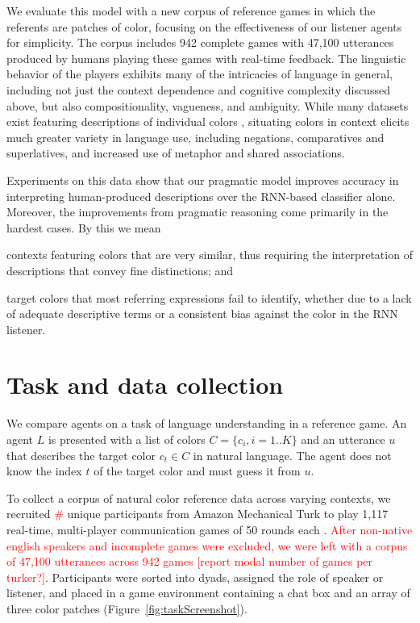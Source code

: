 \documentclass[11pt,letterpaper]{article}
\newcommand{\Listener}{L}
\newcommand{\utt}{u}
\newcommand{\referent}{c}
\newcommand{\context}{C}
\newcommand{\contextlen}{K}
\newcommand{\target}{t}
\renewcommand{\|}{\mid}
\newcommand{\figref}[1]{Figure~\ref{#1}}
\newcommand{\todocheck}[1]{\textcolor{red}{#1}}
\begin{document}
We evaluate this model with a new corpus of reference games in which
the referents are patches of color, focusing on the effectiveness of
our listener agents for simplicity. The corpus includes 942 complete
games with 47,100 utterances produced by humans playing these games
with real-time feedback. The linguistic behavior of the players
exhibits many of the intricacies of language in general, including not
just the context dependence and cognitive complexity discussed above,
but also compositionality, vagueness, and ambiguity. While many
datasets exist featuring descriptions of individual colors
\cite{Cook2005,Munroe2010,Kawakami2016}, situating colors in context
elicits much greater variety in language use, including negations,
comparatives and superlatives, and increased use of metaphor and
shared associations.

Experiments on this data show that our pragmatic model improves accuracy
in interpreting human-produced descriptions over the RNN-based classifier
alone. Moreover, the improvements from pragmatic reasoning come primarily
in the hardest cases. By this we mean \begin{enumerate*}[label=(\arabic*)]
\item contexts featuring colors that are very similar, thus
requiring the interpretation of descriptions that convey fine distinctions; and
\item target colors that most referring expressions fail to identify, whether
due to a lack of adequate descriptive terms or a consistent bias against the
color in the RNN listener.
\end{enumerate*}

\section{Task and data collection}\label{sec:corpus}

We compare agents on a task of language understanding in a reference game. An agent $\Listener$ is presented with a list of colors $\context = \{\referent_i, i=1..\contextlen\}$ and an utterance $\utt$ that describes the target color $\referent_\target \in \context$ in natural language. The agent does not know the index $\target$ of the target color and must guess it from $\utt$.

To collect a corpus of natural color reference data across varying contexts, we recruited \todocheck{\#} unique participants from Amazon Mechanical Turk to play 1,117 real-time, multi-player communication games of 50 rounds each \cite{Hawkins15_RealTimeWebExperiments}. \todocheck{After non-native english speakers and incomplete games were excluded, we were left with a corpus of 47,100 utterances across 942 games [report modal number of games per turker?]}. Participants were sorted into dyads, assigned the role of speaker or listener, and placed in a game environment containing a chat box and an array of three color patches (\figref{fig:taskScreenshot}).
\end{document}
